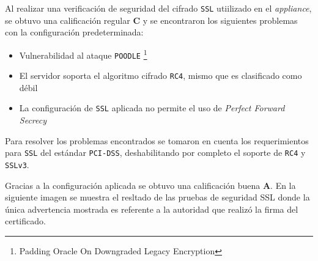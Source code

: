 Al realizar una verificaci\'{o}n de seguridad del cifrado \texttt{SSL} utiilizado en el \textsl{appliance}, se obtuvo una calificaci\'{o}n regular \textbf{C} y se encontraron los siguientes problemas con la configuraci\'{o}n predeterminada:

\begin{itemize}
  \item Vulnerabilidad al ataque \texttt{POODLE} \footnote{Padding Oracle On Downgraded Legacy Encryption} \cite{_ssl_????-1} \cite{_ssl-poodle_????} \cite{_this_????} \cite{barnes_poodle_????} \cite{_security_????-1}

  \item El servidor soporta el algoritmo cifrado \texttt{RC4}, mismo que es clasificado como d\'{e}bil \cite{_security_????}

  \item La configuraci\'{o}n de \texttt{SSL} aplicada no permite el uso de \textsl{Perfect Forward Secrecy} \cite{_forward_2016}
\end{itemize}


Para resolver los problemas encontrados se tomaron en cuenta los requerimientos para \texttt{SSL} del est\'{a}ndar \texttt{PCI-DSS}, deshabilitando por completo el soporte de \texttt{RC4} y \texttt{SSLv3}.

Gracias a la configuraci\'{o}n aplicada se obtuvo una calificaci\'{o}n buena \textbf{A}. En la siguiente imagen se muestra el resltado de las pruebas de seguridad SSL donde la \'{u}nica advertencia mostrada es referente a la autoridad que realiz\'{o} la firma del certificado. \cite{_ssl_????}


